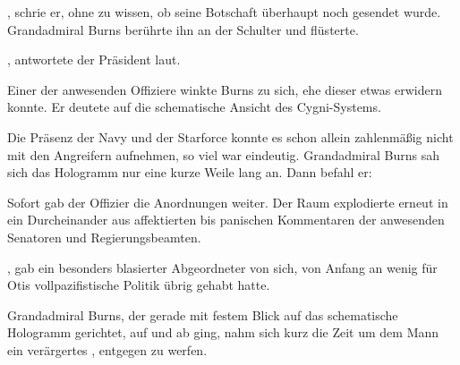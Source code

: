 \par

, schrie er, ohne zu wissen, ob seine Botschaft überhaupt noch gesendet wurde. Grandadmiral Burns berührte ihn an der Schulter und flüsterte. 

\par

, antwortete der Präsident laut. 

\par

Einer der anwesenden Offiziere winkte Burns zu sich, ehe dieser etwas erwidern konnte. Er deutete auf die schematische Ansicht des Cygni-Systems. 

\par

Die Präsenz der Navy und der Starforce konnte es schon allein zahlenmäßig nicht mit den Angreifern aufnehmen, so viel war eindeutig. Grandadmiral Burns sah sich das Hologramm nur eine kurze Weile lang an. Dann befahl er: 

\par

Sofort gab der Offizier die Anordnungen weiter. Der Raum explodierte erneut in ein Durcheinander aus affektierten bis panischen Kommentaren der anwesenden Senatoren und Regierungsbeamten.

\par

, gab ein besonders blasierter Abgeordneter von sich, von Anfang an wenig für Otis vollpazifistische Politik übrig gehabt hatte. 

\par

Grandadmiral Burns, der gerade mit festem Blick auf das schematische Hologramm gerichtet, auf und ab ging, nahm sich kurz die Zeit um dem Mann ein verärgertes , entgegen zu werfen.

